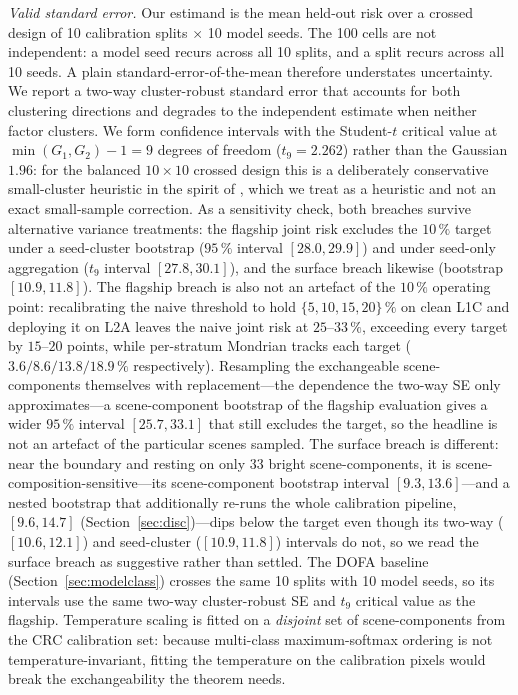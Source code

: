 \documentclass[preprint,3p,times]{elsarticle}
\begin{document}
\emph{Valid standard error.} Our estimand is the mean held-out risk over a crossed design of 10 calibration splits $\times$ 10 model seeds. The 100 cells are not independent: a model seed recurs across all 10 splits, and a split recurs across all 10 seeds. A plain standard-error-of-the-mean therefore understates uncertainty. We report a two-way cluster-robust standard error \citep{cameron2011} that accounts for both clustering directions and degrades to the independent estimate when neither factor clusters. We form confidence intervals with the Student-$t$ critical value at $\min(G_1,G_2)-1 = 9$ degrees of freedom ($t_9 = 2.262$) rather than the Gaussian $1.96$: for the balanced $10 \times 10$ crossed design this is a deliberately conservative small-cluster heuristic in the spirit of \citet{cameron2011}, which we treat as a heuristic and not an exact small-sample correction. As a sensitivity check, both breaches survive alternative variance treatments: the flagship joint risk excludes the $10\,\%$ target under a seed-cluster bootstrap ($95\,\%$ interval $[28.0, 29.9]$) and under seed-only aggregation ($t_9$ interval $[27.8, 30.1]$), and the surface breach likewise (bootstrap $[10.9, 11.8]$). The flagship breach is also not an artefact of the $10\,\%$ operating point: recalibrating the naive threshold to hold $\{5, 10, 15, 20\}\,\%$ on clean L1C and deploying it on L2A leaves the naive joint risk at $25$--$33\,\%$, exceeding every target by $15$--$20$ points, while per-stratum Mondrian tracks each target ($3.6/8.6/13.8/18.9\,\%$ respectively). Resampling the exchangeable scene-components themselves with replacement---the dependence the two-way SE only approximates---a scene-component bootstrap of the flagship evaluation gives a wider $95\,\%$ interval $[25.7, 33.1]$ that still excludes the target, so the headline is not an artefact of the particular scenes sampled. The surface breach is different: near the boundary and resting on only $33$ bright scene-components, it is scene-composition-sensitive---its scene-component bootstrap interval $[9.3, 13.6]$---and a nested bootstrap that additionally re-runs the whole calibration pipeline, $[9.6, 14.7]$ (Section~\ref{sec:disc})---dips below the target even though its two-way ($[10.6, 12.1]$) and seed-cluster ($[10.9, 11.8]$) intervals do not, so we read the surface breach as suggestive rather than settled. The DOFA baseline (Section~\ref{sec:modelclass}) crosses the same 10 splits with 10 model seeds, so its intervals use the same two-way cluster-robust SE and $t_9$ critical value as the flagship. Temperature scaling is fitted on a \emph{disjoint} set of scene-components from the CRC calibration set: because multi-class maximum-softmax ordering is not temperature-invariant, fitting the temperature on the calibration pixels would break the exchangeability the theorem needs.
\end{document}

